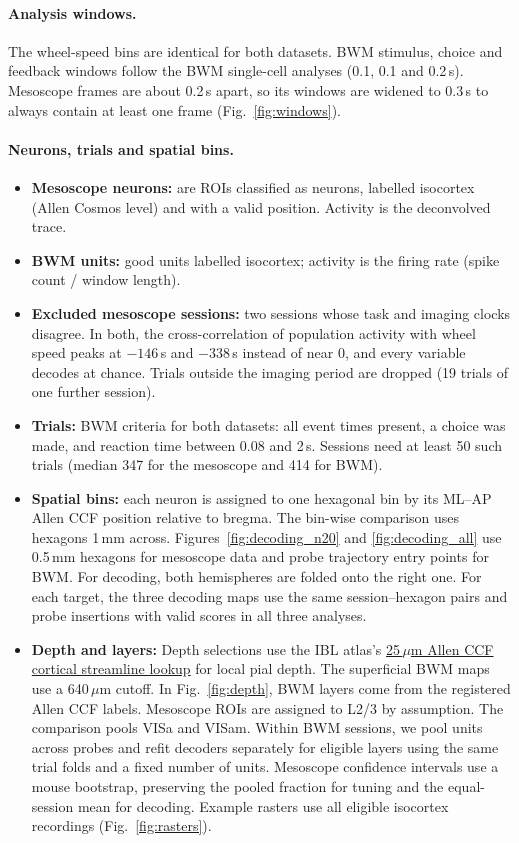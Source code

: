 \documentclass[10pt]{article}
\newcommand{\um}{\,$\mu$m}
\newcommand{\figref}[1]{Fig.~\ref{fig:#1}}
\begin{document}
\paragraph{Analysis windows.}
The wheel-speed bins are identical for both datasets. BWM stimulus, choice and feedback windows follow the BWM single-cell analyses (0.1, 0.1 and 0.2\,s). Mesoscope frames are about 0.2\,s apart, so its windows are widened to 0.3\,s to always contain at least one frame (\figref{windows}).

\paragraph{Neurons, trials and spatial bins.}
\begin{itemize}
  \item \textbf{Mesoscope neurons:} are ROIs classified as neurons, labelled isocortex (Allen Cosmos level) and with a valid position. Activity is the deconvolved trace.
  \item \textbf{BWM units:} good units labelled isocortex; activity is the firing rate (spike count / window length).
  \item \textbf{Excluded mesoscope sessions:} two sessions whose task and imaging clocks disagree. In both, the cross-correlation of population activity with wheel speed peaks at $-146$\,s and $-338$\,s instead of near 0, and every variable decodes at chance. Trials outside the imaging period are dropped (19 trials of one further session).
  \item \textbf{Trials:} BWM criteria for both datasets: all event times present, a choice was made, and reaction time between 0.08 and 2\,s. Sessions need at least 50 such trials (median 347 for the mesoscope and 414 for BWM).
  \item \textbf{Spatial bins:} each neuron is assigned to one hexagonal bin by its ML--AP Allen CCF position relative to bregma. The bin-wise comparison uses hexagons 1\,mm across. Figures~\ref{fig:decoding_n20} and \ref{fig:decoding_all} use 0.5\,mm hexagons for mesoscope data and probe trajectory entry points for BWM. For decoding, both hemispheres are folded onto the right one. For each target, the three decoding maps use the same session--hexagon pairs and probe insertions with valid scores in all three analyses.
  \item \textbf{Depth and layers:} Depth selections use the IBL atlas's \href{https://docs.internationalbrainlab.org/notebooks_external/atlas_streamlines.html}{25\,$\mu$m Allen CCF cortical streamline lookup} for local pial depth. The superficial BWM maps use a 640\um{} cutoff. In \figref{depth}, BWM layers come from the registered Allen CCF labels. Mesoscope ROIs are assigned to L2/3 by assumption. The comparison pools VISa and VISam. Within BWM sessions, we pool units across probes and refit decoders separately for eligible layers using the same trial folds and a fixed number of units. Mesoscope confidence intervals use a mouse bootstrap, preserving the pooled fraction for tuning and the equal-session mean for decoding. Example rasters use all eligible isocortex recordings (\figref{rasters}).
\end{itemize}
\end{document}
